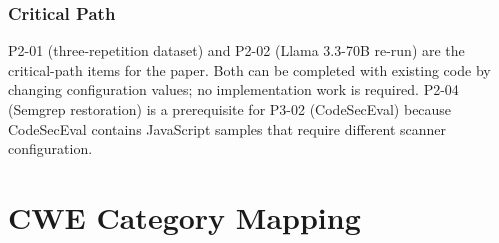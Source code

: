 \documentclass[12pt,a4paper]{report}
\begin{document}
\subsection{Critical Path}

P2-01 (three-repetition dataset) and P2-02 (Llama 3.3-70B re-run) are the
critical-path items for the paper. Both can be completed with existing code by
changing configuration values; no implementation work is required. P2-04
(Semgrep restoration) is a prerequisite for P3-02 (CodeSecEval) because CodeSecEval
contains JavaScript samples that require different scanner configuration.

\appendix

\chapter{CWE Category Mapping}
\label{app:cwemap}
\end{document}
